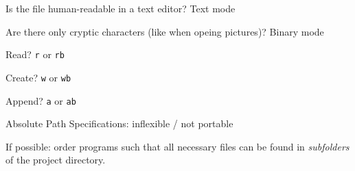\begin{frame}
%
\begin{hintbox}
\small
Is the file human-readable in a text editor?												\tabto{10.5cm} \Thus Text mode

Are there only cryptic characters (\eg like when opeing pictures)?	\tabto{10.5cm} \Thus Binary mode
\end{hintbox}
%
\begin{hintbox}
\small
Read?		\tabto{3cm} \Thus \texttt{r} or \texttt{rb}

Create?	\tabto{3cm} \Thus \texttt{w} or \texttt{wb}

Append?	\tabto{3cm} \Thus \texttt{a} or \texttt{ab}
\end{hintbox}
%
\begin{hintbox}
\small
Absolute Path Specifications: inflexible / not portable

If possible: order programs such that all necessary files can be found in \emph{subfolders} of the project directory.
\end{hintbox}
%
\end{frame}



